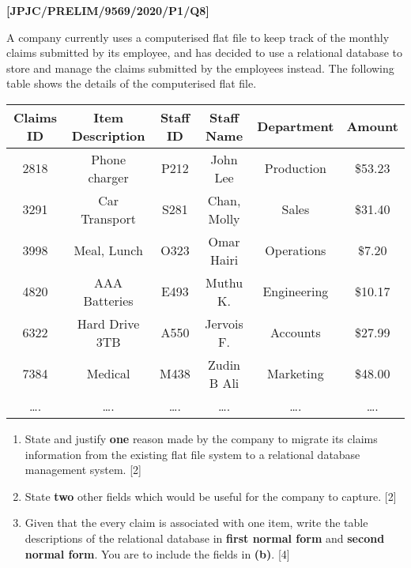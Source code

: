 \item \textbf{{[}JPJC/PRELIM/9569/2020/P1/Q8{]} }

A company currently uses a computerised flat file to keep track of
the monthly claims submitted by its employee, and has decided to use
a relational database to store and manage the claims submitted by
the employees instead. The following table shows the details of the
computerised flat file.

\begin{tabular}{|c|c|c|c|c|c|}
\hline 
Claims ID  & Item Description  & Staff ID  & Staff Name  & Department  & Amount\tabularnewline
\hline 
\hline 
2818 & Phone charger & P212 & John Lee & Production & \$53.23\tabularnewline
\hline 
3291 & Car Transport & S281 & Chan, Molly & Sales & \$31.40\tabularnewline
\hline 
3998 & Meal, Lunch & O323  & Omar Hairi  & Operations & \$7.20\tabularnewline
\hline 
4820  & AAA Batteries  & E493  & Muthu K.  & Engineering  & \$10.17\tabularnewline
\hline 
6322  & Hard Drive 3TB  & A550  & Jervois F.  & Accounts  & \$27.99\tabularnewline
\hline 
7384  & Medical  & M438  & Zudin B Ali  & Marketing  & \$48.00\tabularnewline
\hline 
\dots .  & \dots .  & \dots .  & \dots .  & \dots . & \dots .\tabularnewline
\hline 
\end{tabular}
\begin{enumerate}
\item State and justify \textbf{one} reason made by the company to migrate
its claims information from the existing flat file system to a relational
database management system. \hfill{}{[}2{]}
\item State \textbf{two} other fields which would be useful for the company
to capture. \hfill{}{[}2{]}
\item Given that the every claim is associated with one item, write the
table descriptions of the relational database in \textbf{first normal
form} and \textbf{second normal form}. You are to include the fields
in \textbf{(b)}. \hfill{}{[}4{]}
\end{enumerate}